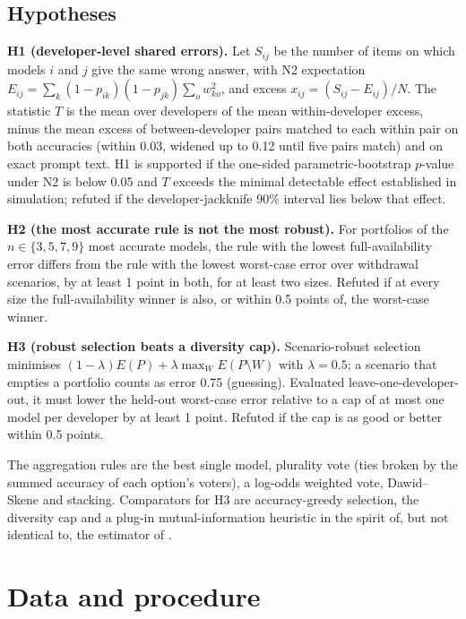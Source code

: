 \documentclass[preprint,12pt,authoryear]{elsarticle}
\begin{document}
\subsection{Hypotheses}
\textbf{H1 (developer-level shared errors).} Let $S_{ij}$ be the number of items on which models $i$ and $j$ give the same wrong answer, with N2 expectation $E_{ij} = \sum_k (1-p_{ik})(1-p_{jk}) \sum_o w_{ko}^2$, and excess $x_{ij} = (S_{ij}-E_{ij})/N$. The statistic $T$ is the mean over developers of the mean within-developer excess, minus the mean excess of between-developer pairs matched to each within pair on both accuracies (within 0.03, widened up to 0.12 until five pairs match) and on exact prompt text. H1 is supported if the one-sided parametric-bootstrap $p$-value under N2 is below 0.05 and $T$ exceeds the minimal detectable effect established in simulation; refuted if the developer-jackknife 90\% interval lies below that effect.

\textbf{H2 (the most accurate rule is not the most robust).} For portfolios of the $n \in \{3,5,7,9\}$ most accurate models, the rule with the lowest full-availability error differs from the rule with the lowest worst-case error over withdrawal scenarios, by at least 1 point in both, for at least two sizes. Refuted if at every size the full-availability winner is also, or within 0.5 points of, the worst-case winner.

\textbf{H3 (robust selection beats a diversity cap).} Scenario-robust selection minimises $(1-\lambda)E(P) + \lambda \max_W E(P\setminus W)$ with $\lambda = 0.5$; a scenario that empties a portfolio counts as error 0.75 (guessing). Evaluated leave-one-developer-out, it must lower the held-out worst-case error relative to a cap of at most one model per developer by at least 1 point. Refuted if the cap is as good or better within 0.5 points.

The aggregation rules are the best single model, plurality vote (ties broken by the summed accuracy of each option's voters), a log-odds weighted vote, Dawid--Skene \citep{dawidskene1979} and stacking. Comparators for H3 are accuracy-greedy selection, the diversity cap and a plug-in mutual-information heuristic in the spirit of, but not identical to, the estimator of \citet{turkmen2026}.

\section{Data and procedure}
\end{document}
